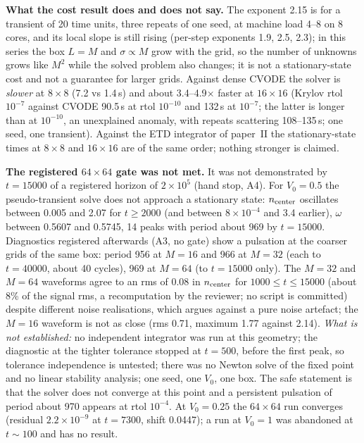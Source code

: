 \documentclass[11pt,a4paper]{article}
\begin{document}

\textbf{What the cost result does and does not say.} The exponent 2.15 is for a transient of 20 time units, three repeats of one
seed, at machine load 4--8 on 8 cores, and its local slope is still rising (per-step exponents 1.9, 2.5, 2.3); in this series the box
$L=M$ and $\sigma\propto M$ grow with the grid, so the number of unknowns grows like $M^{2}$ while the solved problem also changes; it
is not a stationary-state cost and not a guarantee for larger grids. Against dense CVODE the solver is \emph{slower} at $8\times8$ (7.2 vs 1.4\,s) and about 3.4--4.9$\times$ faster at $16\times16$
(Krylov rtol $10^{-7}$ against CVODE 90.5\,s at rtol $10^{-10}$ and 132\,s at $10^{-7}$; the latter is longer than at $10^{-10}$, an
unexplained anomaly, with repeats scattering 108--135\,s; one seed, one transient). Against the ETD integrator of paper~II the
stationary-state times at $8\times8$ and $16\times16$ are of the same order; nothing stronger is claimed.

\begin{failbox}
\textbf{The registered $64\times64$ gate was not met.} It was not demonstrated by $t=15000$ of a registered horizon of $2\times10^5$ (hand stop, A4). For $V_0=0.5$ the pseudo-transient solve does not approach a stationary state:
$n_{\rm center}$ oscillates between 0.005 and 2.07 for $t\ge2000$ (and between $8\times10^{-4}$ and 3.4 earlier), $\omega$ between 0.5607 and
0.5745, 14 peaks with period about 969 by $t=15000$. Diagnostics registered afterwards (A3, no gate) show a pulsation at the coarser
grids of the same box: period 956 at $M=16$ and 966 at $M=32$ (each to $t=40000$, about 40 cycles), 969 at $M=64$ (to $t=15000$ only).
The $M=32$ and $M=64$ waveforms agree to an rms of 0.08 in $n_{\rm center}$ for $1000\le t\le15000$ (about 8\% of the signal rms, a
recomputation by the reviewer; no script is committed) despite different noise realisations, which argues against a pure noise artefact;
the $M=16$ waveform is not as close (rms 0.71, maximum 1.77 against 2.14). \emph{What is not established:} no independent integrator
was run at this geometry; the diagnostic at the tighter tolerance stopped at $t=500$, before the first peak, so tolerance
independence is untested; there was no Newton solve of the fixed point and no linear stability analysis; one seed, one $V_0$, one box.
The safe statement is that the solver does not converge at this point and a persistent pulsation of period about 970 appears at rtol
$10^{-4}$. At $V_0=0.25$ the $64\times64$ run converges (residual $2.2\times10^{-9}$ at $t=7300$, shift 0.0447); a run at $V_0=1$ was
abandoned at $t\sim100$ and has no result.
\end{failbox}
\end{document}
